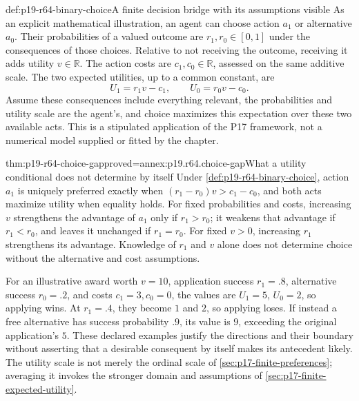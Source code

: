 \begin{hbdefinition}{def:p19-r64-binary-choice}{A finite decision bridge with its assumptions visible}
As an explicit mathematical illustration, an agent can choose action
\(a_1\) or alternative \(a_0\). Their probabilities of a valued outcome
are \(r_1,r_0\in[0,1]\) under the consequences of those choices.
Relative to not receiving the outcome, receiving it adds utility \(v\in\mathbb R\).
The action costs are \(c_1,c_0\in\mathbb R\), assessed on the same additive scale.
The two expected utilities, up to a common constant, are
\[
 U_1=r_1v-c_1,\qquad U_0=r_0v-c_0.
\]
Assume these consequences include everything relevant, the probabilities
and utility scale are the agent's, and choice maximizes this expectation
over these two available acts. This is a stipulated application of the
P17 framework, not a numerical model supplied or fitted by the chapter.
\end{hbdefinition}

\begin{hblemma}{thm:p19-r64-choice-gap}{proved=annex:p19.r64.choice-gap}{What a utility conditional does not determine by itself}
Under \cref{def:p19-r64-binary-choice}, action \(a_1\) is uniquely preferred
exactly when \((r_1-r_0)v>c_1-c_0\), and both acts maximize utility
when equality holds. For fixed probabilities and costs, increasing \(v\)
strengthens the advantage of \(a_1\) only if \(r_1>r_0\); it weakens
that advantage if \(r_1<r_0\), and leaves it unchanged if \(r_1=r_0\).
For fixed \(v>0\), increasing \(r_1\) strengthens its advantage.
Knowledge of \(r_1\) and \(v\) alone does not determine choice without
the alternative and cost assumptions.
\end{hblemma}

For an illustrative award worth \(v=10\), application success
\(r_1=.8\), alternative success \(r_0=.2\), and costs
\(c_1=3,c_0=0\), the values are \(U_1=5\), \(U_0=2\),
so applying wins. At \(r_1=.4\), they become \(1\) and \(2\),
so applying loses. If instead a free alternative has success probability
\(.9\), its value is \(9\), exceeding the original application's \(5\).
These declared examples justify the directions and their boundary without
asserting that a desirable consequent by itself makes its antecedent likely.
The utility scale is not merely the ordinal scale of
\cref{sec:p17-finite-preferences}; averaging it invokes the stronger
domain and assumptions of \cref{sec:p17-finite-expected-utility}.

